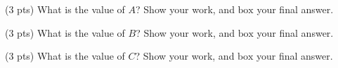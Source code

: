 \documentclass[twoside,12pt]{article}
\begin{document}
\begin{probset}
\begin{prob}[(10 pts)]
\begin{prob}[(9 pts)]
\begin{subprobset}

\begin{subprob}(3 pts) What is the value of $A$? Show your work, and $\boxed{\text{box}}$ your final answer.

\begin{responsebox}{1in}
    
\end{responsebox}

\end{subprob}

\begin{subprob}(3 pts) What is the value of $B$? Show your work, and $\boxed{\text{box}}$ your final answer.

\begin{responsebox}{1in}
    
\end{responsebox}

\end{subprob}

\begin{subprob}(3 pts) What is the value of $C$? Show your work, and $\boxed{\text{box}}$ your final answer.

\begin{responsebox}{1in}
    
\end{responsebox}

\end{subprob}
    
\end{subprobset}


    
\end{prob}

\newpage





\end{prob}
\end{probset}
\end{document}
